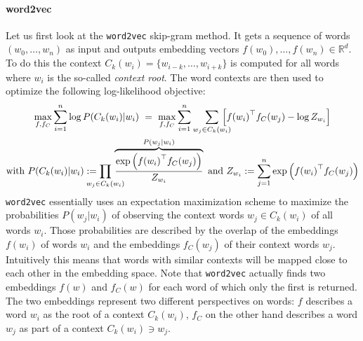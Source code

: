 \paragraph{word2vec}
Let us first look at the \texttt{word2vec} skip-gram method.
It gets a sequence of words $(w_0, \dots, w_n)$ as input and outputs embedding vectors $f(w_0), \dots, f(w_n) \in \mathbb{R}^d$.
To do this the context $C_k(w_i) = \{ w_{i-k}, \dots, w_{i + k} \}$ is computed for all words where $w_i$ is the so-called \textit{context root}.
The word contexts are then used to optimize the following log-likelihood objective:
\begin{gather}
	\max_{f, f_C} \sum_{i = 1}^n \log P(C_k(w_i) | w_i)\ =\ \max_{f, f_C} \sum_{i = 1}^n \smashoperator[r]{\sum_{w_j \in C_k(w_i)}}\, \left[ {f(w_i)}^\top f_C(w_j) - \log Z_{w_i} \right] \label{eq:related:gcr:embed:word2vec}\\
	\text{with } P(C_k(w_i) | w_i) := \prod_{\mathclap{w_j \in C_k(w_i)}}\, \overbrace{\frac{\exp\left({f(w_i)}^\top f_C(w_j)\right)}{Z_{w_i}}}^{P(w_j | w_i)}
	\text{ and } Z_{w_i} := \sum_{j = 1}^n \exp\left({f(w_i)}^\top f_C(w_j)\right) \nonumber
\end{gather}
\texttt{word2vec} essentially uses an expectation maximization scheme to maximize the probabilities $P(w_j | w_i)$ of observing the context words $w_j \in C_k(w_i)$ of all words $w_i$.
Those probabilities are described by the overlap of the embeddings $f(w_i)$ of words $w_i$ and the embeddings $f_C(w_j)$ of their context words $w_j$.
Intuitively this means that words with similar contexts will be mapped close to each other in the embedding space.
Note that \texttt{word2vec} actually finds two embeddings $f(w)$ and $f_C(w)$ for each word of which only the first is returned.
The two embeddings represent two different perspectives on words: $f$ describes a word $w_i$ as the root of a context $C_k(w_i)$, $f_C$ on the other hand describes a word $w_j$ as part of a context $C_k(w_i) \ni w_j$.

